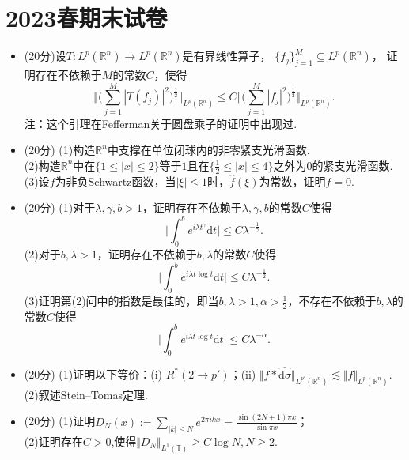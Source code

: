 
\section{2023春期末试卷}
\begin{itemize}
\item[1.](20分)设$T:L^p(\mathbb{R}^n)\to L^p(\mathbb{R}^n)$是有界线性算子，
$\{ f_j \}_{j=1}^M \subseteq L^p(\mathbb{R}^n)$，
证明存在不依赖于$M$的常数$C$，使得
$$\bigg\Vert \bigg(\sum_{j=1}^M \left\vert T(f_j) \right\vert ^2\bigg)^{\frac{1}{2}}\bigg\Vert _{L^p(\mathbb{R}^n)}
\leq C \bigg\Vert \bigg(\sum_{j=1}^M \left\vert f_j \right\vert ^2\bigg)^{\frac{1}{2}}\bigg\Vert _{L^p(\mathbb{R}^n)}.$$
注：这个引理在Fefferman关于圆盘乘子的证明中出现过.
\item[2.](20分) (1)构造$\mathbb{R}^n$中支撑在单位闭球内的非零紧支光滑函数.\\
(2)构造$\mathbb{R}^n$中在$\{ 1\leq \left\vert x \right\vert \leq 2 \}$等于$1$且在$\{ \frac{1}{2}\leq \left\vert  x \right\vert \leq 4 \}$之外为$0$的紧支光滑函数.\\
(3)设$f$为非负Schwartz函数，当$ \left\vert \xi \right\vert \leq 1 $时，$\hat{f}(\xi)$为常数，证明$f=0$.
\item[3.](20分) (1)对于$\lambda,\gamma,b>1$，证明存在不依赖于$\lambda,\gamma,b$的常数$C$使得
$$\bigg\vert \int_0^be^{i \lambda t^\gamma}\mathrm{d}t\bigg\vert \leq C \lambda^{-{\frac{1}{\gamma}}}.$$
(2)对于$b,\lambda>1$，证明存在不依赖于$b,\lambda$的常数$C$使得
$$\bigg\vert \int_0^be^{i\lambda t\log t}\mathrm{d}t\bigg\vert \leq C\lambda^{-\frac{1}{2}}.$$
(3)证明第(2)问中的指数是最佳的，即当$b,\lambda>1,\alpha>\frac{1}{2}$，不存在不依赖于$b,\lambda$的常数$C$使得
$$\bigg\vert \int_0^be^{i\lambda t\log t}\mathrm{d}t\bigg\vert \leq C\lambda^{-\alpha}.$$
\item[4.](20分) (1)证明以下等价：(i) $R^*(2\to p')$；(ii) $\Vert f*\widehat{\mathrm{d}\sigma}\Vert_{L^{p'}(\mathbb{R}^n)}\lesssim \Vert f\Vert_{L^p(\mathbb{R}^n)}.$\\
(2)叙述Stein--Tomas定理.
\item[5.](20分) (1)证明$D_N(x):=\sum\limits_{\left\vert k \right\vert \leq N}e^{2 \pi ikx}={\displaystyle\frac{\sin(2N+1)\pi x}{\sin \pi x}}$；\\
(2)证明存在$C>0$,使得$\Vert D_N\Vert_{L^1({\mathbb{T}})}\geq C \log N,N\geq 2$.
\end{itemize}
